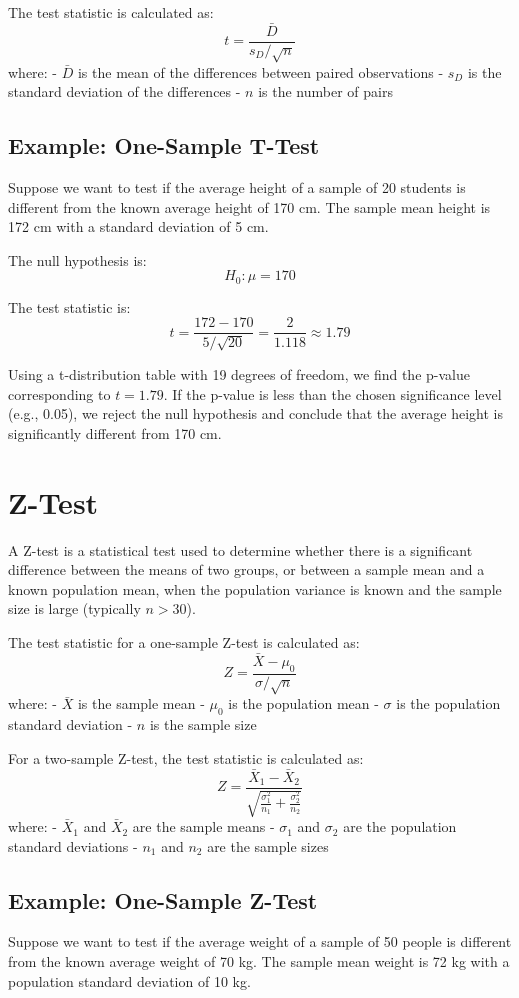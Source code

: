 \documentclass{article}
\begin{document}
The test statistic is calculated as:
\[
t = \frac{\bar{D}}{s_D / \sqrt{n}}
\]
where:
- \(\bar{D}\) is the mean of the differences between paired observations
- \(s_D\) is the standard deviation of the differences
- \(n\) is the number of pairs

\subsection{Example: One-Sample T-Test}
Suppose we want to test if the average height of a sample of 20 students is different from the known average height of 170 cm. The sample mean height is 172 cm with a standard deviation of 5 cm.

The null hypothesis is:
\[
H_0: \mu = 170
\]

The test statistic is:
\[
t = \frac{172 - 170}{5 / \sqrt{20}} = \frac{2}{1.118} \approx 1.79
\]

Using a t-distribution table with 19 degrees of freedom, we find the p-value corresponding to \(t = 1.79\). If the p-value is less than the chosen significance level (e.g., 0.05), we reject the null hypothesis and conclude that the average height is significantly different from 170 cm.

\section{Z-Test}
A Z-test is a statistical test used to determine whether there is a significant difference between the means of two groups, or between a sample mean and a known population mean, when the population variance is known and the sample size is large (typically \(n > 30\)).

The test statistic for a one-sample Z-test is calculated as:
\[
Z = \frac{\bar{X} - \mu_0}{\sigma / \sqrt{n}}
\]
where:
- \(\bar{X}\) is the sample mean
- \(\mu_0\) is the population mean
- \(\sigma\) is the population standard deviation
- \(n\) is the sample size

For a two-sample Z-test, the test statistic is calculated as:
\[
Z = \frac{\bar{X}_1 - \bar{X}_2}{\sqrt{\frac{\sigma_1^2}{n_1} + \frac{\sigma_2^2}{n_2}}}
\]
where:
- \(\bar{X}_1\) and \(\bar{X}_2\) are the sample means
- \(\sigma_1\) and \(\sigma_2\) are the population standard deviations
- \(n_1\) and \(n_2\) are the sample sizes

\subsection{Example: One-Sample Z-Test}
Suppose we want to test if the average weight of a sample of 50 people is different from the known average weight of 70 kg. The sample mean weight is 72 kg with a population standard deviation of 10 kg.
\end{document}
